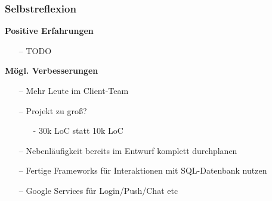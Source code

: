 \documentclass[aspectratio=1610]{beamer}
\begin{document}
	\begin{frame}[plain]
        \frametitle{\textbf{Selbstreflexion}}
        \begin{minipage}{0.5\textwidth}
            \textbf{Positive Erfahrungen}
            \begin{itemize}
                \item[--] TODO %
            \end{itemize}
        \end{minipage}%
        \begin{minipage}{0.5\textwidth}
            \textbf{Mögl. Verbesserungen}
            \begin{itemize}
                \item[--] Mehr Leute im Client-Team
                \item[--] Projekt zu groß?
                    \begin{itemize}
                        \item[-] 30k LoC statt 10k LoC
                    \end{itemize}
                \item[--] Nebenläufigkeit bereits im Entwurf komplett
                    durchplanen
                \item[--] Fertige Frameworks für Interaktionen mit
                    SQL-Datenbank nutzen
                \item[--] Google Services für Login/Push/Chat etc
            \end{itemize}
        \end{minipage}
    \end{frame}
\end{document}
